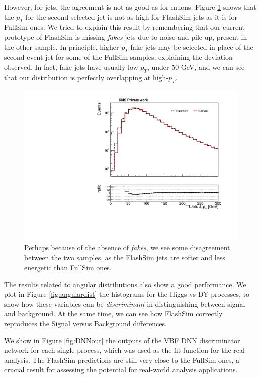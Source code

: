 However, for jets, the agreement is not as good as for muons. Figure \ref{fig:j1pt} shows that the $p_T$ for the second selected jet is not as high for FlashSim jets as it is for FullSim ones. We tried to explain this result by remembering that our current prototype of FlashSim is missing \emph{fakes} jets due to noise and pile-up, present in the other sample. In principle, higher-$p_T$ fake jets may be selected in place of the second event jet for some of the FullSim samples, explaining the deviation observed. In fact, fake jets have usually low-$p_T$, under 50 GeV, and we can see that our distribution is perfectly overlapping at high-$p_T$.

\begin{figure}
    \centering
    \includegraphics[width=\linewidth]{gfx/ch6/TTJets_J1_pt____log.pdf}
    \caption[J$_1$ $p_T$]{Perhaps because of the absence of \emph{fakes}, we see some disagreement between the two samples, as the FlashSim jets are softer and less energetic than FullSim ones.}
    \label{fig:j1pt}
\end{figure}

The results related to angular distributions also show a good performance. We plot in Figure \ref{fig:angulardist} the histograms for the Higgs vs DY processes, to show how these variables can be \emph{discriminant} in distinguishing between signal and background. At the same time, we can see how FlashSim correctly reproduces the Signal versus Background differences.

We show in Figure \ref{fig:DNNout} the outputs of the VBF DNN discriminator network for each single process, which was used as the fit function for the real analysis. The FlashSim predictions are still very close to the FullSim ones, a crucial result for assessing the potential for real-world analysis applications.

